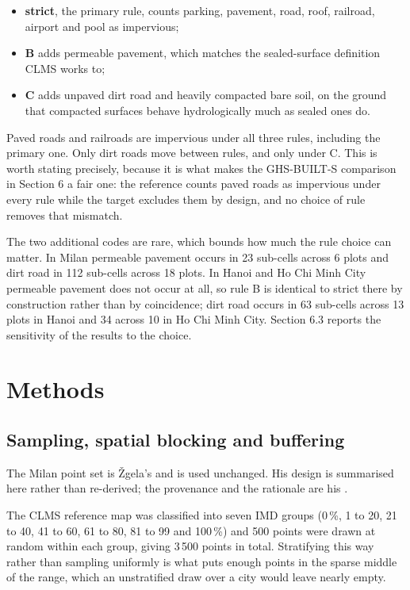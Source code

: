 \documentclass[11pt,a4paper]{article}
\begin{document}
\begin{itemize}
  \item \textbf{strict}, the primary rule, counts parking, pavement, road, roof, railroad,
        airport and pool as impervious;
  \item \textbf{B} adds permeable pavement, which matches the sealed-surface definition
        CLMS works to;
  \item \textbf{C} adds unpaved dirt road and heavily compacted bare soil, on the ground
        that compacted surfaces behave hydrologically much as sealed ones do.
\end{itemize}

Paved roads and railroads are impervious under all three rules, including the
primary one. Only dirt roads move between rules, and only under C. This is worth
stating precisely, because it is what makes the GHS-BUILT-S comparison in
Section 6 a fair one: the reference counts paved roads as impervious under every
rule while the target excludes them by design, and no choice of rule removes
that mismatch.

The two additional codes are rare, which bounds how much the rule choice can
matter. In Milan permeable pavement occurs in 23 sub-cells across 6 plots and
dirt road in 112 sub-cells across 18 plots. In Hanoi and Ho Chi Minh City
permeable pavement does not occur at all, so rule B is identical to strict there
by construction rather than by coincidence; dirt road occurs in 63 sub-cells
across 13 plots in Hanoi and 34 across 10 in Ho Chi Minh City. Section 6.3
reports the sensitivity of the results to the choice.

\section{Methods}

\subsection{Sampling, spatial blocking and buffering}

The Milan point set is Žgela's and is used unchanged. His design is summarised
here rather than re-derived; the provenance and the rationale are his
\cite[pp.~2, 4, Figs.~1--2]{zgela2026}.

The CLMS reference map was classified into seven IMD groups (0\,\%, 1 to 20, 21
to 40, 41 to 60, 61 to 80, 81 to 99 and 100\,\%) and 500 points were drawn at
random within each group, giving 3\,500 points in total. Stratifying this way
rather than sampling uniformly is what puts enough points in the sparse middle
of the range, which an unstratified draw over a city would leave nearly empty.
\end{document}
